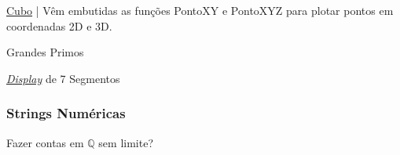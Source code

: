\documentclass[12pt,a4paper]{article}
\begin{document}
			\href{https://github.com/boralaemcasa/propagation/tree/master/webs%20dot%20com/info/cubo.zip}{Cubo} | V\^em embutidas as fun\c{c}\~oes PontoXY e PontoXYZ para plotar pontos em coordenadas 2D e 3D.

			Grandes Primos \cite{primos}

			\href{https://github.com/boralaemcasa/propagation/tree/master/webs%20dot%20com/info/display.zip}{\emph{Display}} de 7 Segmentos

			\subsubsection{Strings Num\'ericas}
				\begin{flushright}
				\end{flushright}

				Fazer contas em $ \mathbb{Q} $ \footnotemark[1] sem limite?

\end{document}
